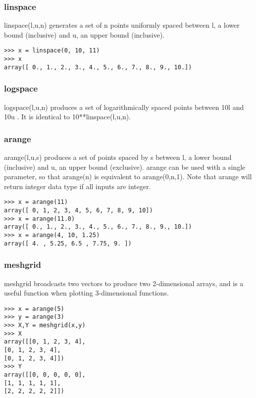 \documentclass[KSmain.tex]{subfiles}
\begin{document}
\subsubsection{linspace}
linspace(l,u,n) generates a set of n points uniformly spaced between l, a lower bound (inclusive) and u,
an upper bound (inclusive).
\begin{framed}
\begin{verbatim}
>>> x = linspace(0, 10, 11)
>>> x
array([ 0., 1., 2., 3., 4., 5., 6., 7., 8., 9., 10.])
\end{verbatim}
\end{framed}
\subsubsection{logspace}
logspace(l,u,n) produces a set of logarithmically spaced points between 10l and 10u . It is identical to
10**linspace(l,u,n).
\subsubsection{arange}
arange(l,u,s) produces a set of points spaced by s between l, a lower bound (inclusive) and u, an upper
bound (exclusive). arange can be used with a single parameter, so that arange(n) is equivalent to
arange(0,n,1). Note that arange will return integer data type if all inputs are integer.
\begin{framed}
\begin{verbatim}
>>> x = arange(11)
array([ 0, 1, 2, 3, 4, 5, 6, 7, 8, 9, 10])
>>> x = arange(11.0)
array([ 0., 1., 2., 3., 4., 5., 6., 7., 8., 9., 10.])
>>> x = arange(4, 10, 1.25)
array([ 4. , 5.25, 6.5 , 7.75, 9. ])
\end{verbatim}
\end{framed}
\subsubsection{meshgrid}
meshgrid broadcasts two vectors to produce two 2-dimensional arrays, and is a useful function when plotting
3-dimensional functions.
\begin{framed}
\begin{verbatim}
>>> x = arange(5)
>>> y = arange(3)
>>> X,Y = meshgrid(x,y)
>>> X
array([[0, 1, 2, 3, 4],
[0, 1, 2, 3, 4],
[0, 1, 2, 3, 4]])
>>> Y
array([[0, 0, 0, 0, 0],
[1, 1, 1, 1, 1],
[2, 2, 2, 2, 2]])
\end{verbatim}
\end{framed}
\end{document}
